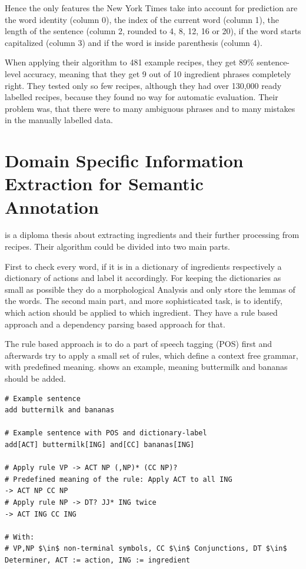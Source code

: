 \documentclass[12pt, twoside]{report}
\begin{document}
Hence the only features the New York Times take into account for prediction are the word identity (column 0), the index of the current word (column 1), the length of the sentence (column 2, rounded to 4, 8, 12, 16 or 20), if the word starts capitalized (column 3) and if the word is inside parenthesis (column 4).

When applying their algorithm to 481 example recipes, they get 89\% sentence-level accuracy, meaning that they get 9 out of 10 ingredient phrases completely right. They tested only so few recipes, although they had over 130,000 ready labelled recipes, because they found no way for automatic evaluation. Their problem was, that there were to many ambiguous phrases and to many mistakes in the manually labelled data.
 
 
\section{Domain Specific Information Extraction for Semantic Annotation}
\parencite{GrammaBased} is a diploma thesis about extracting ingredients and their further processing from recipes. Their algorithm could be divided into two main parts.

First to check every word, if it is in a dictionary of ingredients respectively a dictionary of actions and label it accordingly. For keeping the dictionaries as small as possible they do a morphological Analysis and only store the lemmas of the words. The second main part, and more sophisticated task, is to identify, which action should be applied to which ingredient. They have a rule based approach and a dependency parsing based approach for that.

The rule based approach is to do a part of speech tagging (POS) first and afterwards try to apply a small set of rules, which define a context free grammar, with predefined meaning.  shows an example, meaning buttermilk and bananas should be added.

\begin{lstlisting}[frame=single, basicstyle=\footnotesize\ttfamily,caption={Rule based example}, label=lst:ruleBased, mathescape]
# Example sentence
add buttermilk and bananas

# Example sentence with POS and dictionary-label
add[ACT] buttermilk[ING] and[CC] bananas[ING]

# Apply rule VP -> ACT NP (,NP)* (CC NP)?
# Predefined meaning of the rule: Apply ACT to all ING  
-> ACT NP CC NP
# Apply rule NP -> DT? JJ* ING twice  
-> ACT ING CC ING

# With: 
# VP,NP $\in$ non-terminal symbols, CC $\in$ Conjunctions, DT $\in$ Determiner, ACT := action, ING := ingredient
\end{lstlisting}
\end{document}

